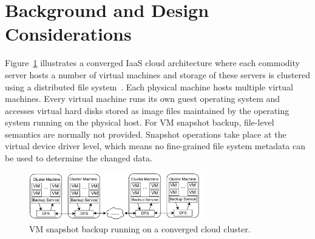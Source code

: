 \section{Background and Design Considerations}
\label{sect:background}

Figure~\ref{fig:collocated} illustrates a converged IaaS cloud architecture 
where
each commodity server hosts a number of virtual machines and storage of these servers
is clustered using a distributed file system~\cite{googlefs03,hdfs10,NutanixPaper}.
Each physical machine hosts multiple virtual machines.  Every virtual machine
runs its own guest operating system and accesses virtual hard disks 
stored as image files maintained by the operating system running on the
physical host.
For VM snapshot backup, file-level semantics are normally not provided.
Snapshot operations take place at the virtual device driver level, which
means no fine-grained file system metadata can be used to determine the changed data. 





\begin{figure}[htb]
    \centering
    \includegraphics[width=3in]{images/colocated-arch}
    \caption{VM snapshot backup running on a converged cloud cluster.}
    \label{fig:collocated}
\end{figure}

